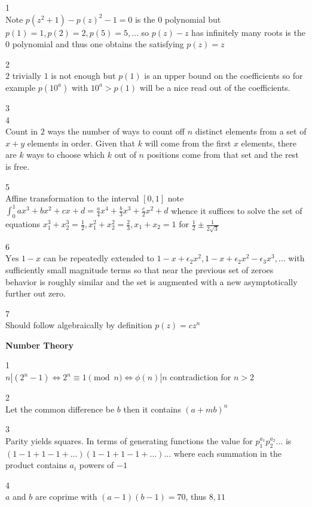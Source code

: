 1 \\
Note $p(z^2+1)-p(z)^2-1=0$ is the $0$ polynomial but $p(1)=1,p(2)=2,p(5)=5,\dots$ so $p(z)-z$ has infinitely many roots is the $0$ polynomial and thus one obtains the satisfying $\boxed{p(z)=z}$

2 \\
$\boxed{2}$ trivially $1$ is not enough but $p(1)$ is an upper bound on the coefficients so for example $p(10^a)$ with $10^a>p(1)$ will be a nice read out of the coefficients.

3 \\


4 \\
Count in $2$ ways the number of ways to count off $n$ distinct elements from a set of $x+y$ elements in order. Given that $k$ will come from the first $x$ elements, there are $k$ ways to choose which $k$ out of $n$ positions come from that set and the rest is free.

5 \\
Affine transformation to the interval $[0,1]$ note $\int_0^1 ax^3+bx^2+cx+d=\frac{a}{4}x^4+\frac{b}{3}x^3+\frac{c}{2}x^2+d$ whence it suffices to solve the set of equations $x_1^3+x_2^3=\frac{1}{2},x_1^2+x_2^2=\frac{2}{3},x_1+x_2=1$ for $\frac{1}{2}\pm \frac{1}{2\sqrt{3}}$

6 \\
$\boxed{\text{Yes}}$ $1-x$ can be repeatedly extended to $1-x+\epsilon_2 x^2, 1-x+\epsilon_2 x^2-\epsilon_3 x^3, \dots$ with sufficiently small magnitude terms so that near the previous set of zeroes behavior is roughly similar and the set is augmented with a new asymptotically further out zero.

7 \\
Should follow algebraically by definition $p(z)=cz^n$

\newpage

\textbf{Number Theory}

1 \\
$n|(2^n-1) \iff 2^n \equiv 1 \pmod{n} \iff \phi(n)|n$ contradiction for $n>2$

2 \\
Let the common difference be $b$ then it contains $(a+mb)^n$

3 \\
Parity yields squares. In terms of generating functions the value for $p_1^{a_1}p_2^{a_2}\dots$ is $(1-1+1-1+\dots)(1-1+1-1+\dots)\dots$ where each summation in the product contains $a_i$ powers of $-1$

4 \\
$a$ and $b$ are coprime with $(a-1)(b-1)=70$, thus $\boxed{8,11}$

